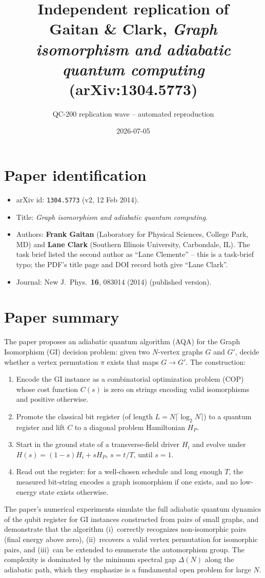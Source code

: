 \documentclass[11pt]{article}
\title{Independent replication of\\
Gaitan \& Clark, \emph{Graph isomorphism and adiabatic quantum computing}\\
(arXiv:1304.5773)}
\author{QC-200 replication wave -- automated reproduction}
\date{2026-07-05}
\begin{document}
\maketitle

\section{Paper identification}
\begin{itemize}
  \item arXiv id: \texttt{1304.5773} (v2, 12 Feb 2014).
  \item Title: \emph{Graph isomorphism and adiabatic quantum computing}.
  \item Authors: \textbf{Frank Gaitan} (Laboratory for Physical Sciences, College Park, MD) and \textbf{Lane Clark} (Southern Illinois University, Carbondale, IL).
        The task brief listed the second author as ``Lane Clemente'' -- this is a task-brief typo; the PDF's title page and DOI record both give ``Lane Clark''.
  \item Journal: New J.\ Phys.\ \textbf{16}, 083014 (2014) (published version).
\end{itemize}

\section{Paper summary}
The paper proposes an adiabatic quantum algorithm (AQA) for the Graph Isomorphism (GI) decision problem: given two $N$-vertex graphs $G$ and $G'$, decide whether a vertex permutation $\pi$ exists that maps $G\to G'$. The construction:
\begin{enumerate}
  \item Encode the GI instance as a combinatorial optimization problem (COP) whose cost function $C(s)$ is zero on strings encoding valid isomorphisms and positive otherwise.
  \item Promote the classical bit register (of length $L=N\lceil\log_2 N\rceil$) to a quantum register and lift $C$ to a diagonal problem Hamiltonian $H_P$.
  \item Start in the ground state of a transverse-field driver $H_i$ and evolve under $H(s)=(1-s)H_i+sH_P$, $s=t/T$, until $s=1$.
  \item Read out the register: for a well-chosen schedule and long enough $T$, the measured bit-string encodes a graph isomorphism if one exists, and no low-energy state exists otherwise.
\end{enumerate}
The paper's numerical experiments simulate the full adiabatic quantum dynamics of the qubit register for GI instances constructed from pairs of small graphs, and demonstrate that the algorithm (i)~correctly recognizes non-isomorphic pairs (final energy above zero), (ii)~recovers a valid vertex permutation for isomorphic pairs, and (iii)~can be extended to enumerate the automorphism group. The complexity is dominated by the minimum spectral gap $\Delta(N)$ along the adiabatic path, which they emphasize is a fundamental open problem for large $N$.
\end{document}
